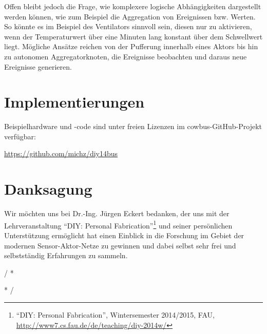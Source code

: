 \documentclass[conference]{IEEEtran}
\begin{document}
    Offen bleibt jedoch die Frage,
    wie komplexere logische Abhängigkeiten dargestellt werden können,
    wie zum Beispiel die Aggregation von Ereignissen bzw. Werten.
    So könnte es im Beispiel des Ventilators sinnvoll sein, diesen nur zu
    aktivieren, wenn der Temperaturwert über eine Minuten lang konstant über
    dem Schwellwert liegt.
    Mögliche Ansätze reichen von der Pufferung innerhalb eines Aktors
    bis hin zu autonomen Aggregatorknoten,
    die Ereignisse beobachten und daraus neue Ereignisse generieren.

    \vspace*{0.5cm}

\section*{Implementierungen}
    Beispielhardware und -code sind unter freien Lizenzen im
    cowbus-GitHub-Projekt verfügbar:

    \url{https://github.com/michz/diy14bus}

\section*{Danksagung}
    Wir möchten uns bei Dr.-Ing. Jürgen Eckert bedanken,
    der uns mit der Lehrveranstaltung
    \enquote{DIY: Personal Fabrication}\footnote{\enquote{DIY: Personal Fabrication},
        Wintersemester 2014/2015, FAU,
        \url{http://www7.cs.fau.de/de/teaching/diy-2014w/}}
    und seiner persönlichen Unterstützung ermöglicht hat
    einen Einblick in die Forschung im Gebiet der modernen
    Sensor-Aktor-Netze zu gewinnen und dabei selbst sehr frei
    und selbstständig Erfahrungen zu sammeln.


    \vspace*{0.5cm}


\renewcommand{\IEEEiedlistdecl}{\IEEEsetlabelwidth{CSMA/CA}}
\begin{acronym}
\end{acronym}
\renewcommand{\IEEEiedlistdecl}{\relax}%

\comment / *
\listoffigures
\clearpage

\listoftables
\clearpage
* /




\end{document}
